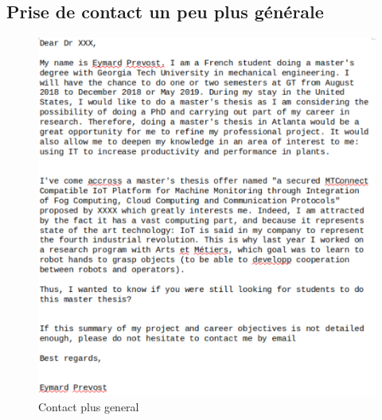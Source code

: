 \documentclass{article}
\begin{document}
\subsection{Prise de contact un peu plus générale}
\begin{figure}[h]
\begin{center}
\includegraphics[width=14cm]{mail_Eymard.png} 
\end{center}
\caption{Contact plus general}
\label{Contact plus generale}
\end{figure}
\end{document}
